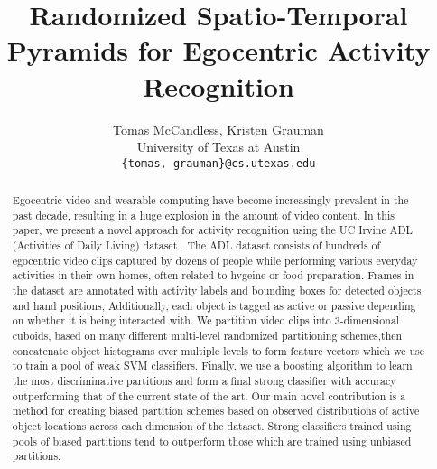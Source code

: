 \documentclass[10pt,twocolumn,letterpaper]{article}
\begin{document}
\title{Randomized Spatio-Temporal Pyramids for Egocentric Activity Recognition}

\author{Tomas McCandless, Kristen Grauman\\
University of Texas at Austin\\
{\tt\small \{tomas, grauman\}@cs.utexas.edu}
}

\maketitle

\begin{abstract}
	Egocentric video and wearable computing have become increasingly
	prevalent in the past decade, resulting in a huge explosion in the amount
	of video content. In this paper, we present a novel approach for
	activity recognition using the UC Irvine ADL (Activities of Daily Living)
	dataset \cite{Ramanan12}. The ADL dataset consists of hundreds of egocentric video clips
	captured by dozens of people while performing various everyday activities in their own
	homes, often related to hygeine or food preparation. Frames in the dataset
	are annotated with activity labels and bounding boxes for detected objects and hand positions, 
	Additionally, each object is tagged as active or passive depending
	on whether it is being interacted with. We partition video clips into
	3-dimensional cuboids, based on many different multi-level randomized partitioning
	schemes,then concatenate object histograms
	over multiple levels to form feature vectors which we use to train a pool
	of weak SVM classifiers. 
	Finally, we use a boosting algorithm to learn the most discriminative
	partitions and form a
	final strong classifier with accuracy outperforming that of the current state of
	the art. Our main novel contribution is a method for
	creating biased partition schemes based on observed distributions of
	active object locations across each dimension of the dataset.
	Strong classifiers trained using pools of biased partitions tend to outperform 
	those which are trained using unbiased partitions.
\end{abstract}
\end{document}

